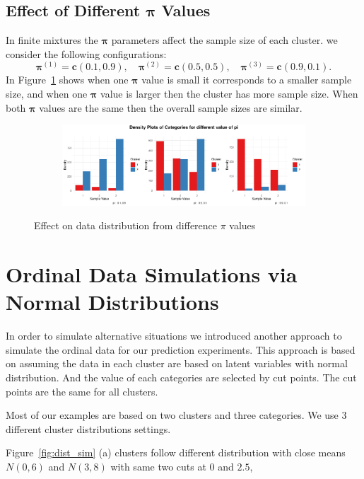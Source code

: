 \documentclass{article}
\begin{document}
\subsection{Effect of Different $\bm{\pi}$ Values}
In finite mixtures the $\bm{\pi}$ parameters affect the sample size of each cluster. 
we consider the following configurations:
\[
\bm{\pi}^{(1)} = \mathbf{c}(0.1, 0.9), \quad 
\bm{\pi}^{(2)} = \mathbf{c}(0.5, 0.5), \quad 
\bm{\pi}^{(3)} = \mathbf{c}(0.9, 0.1).
\]
In Figure~\ref{fig:pi} shows when one $\bm{\pi}$ value is small it corresponds to a smaller sample size, and when one $\bm{\pi}$ value is larger then the cluster has more sample size.
When both $\bm{\pi}$ values are the same then the overall sample sizes are similar.
\begin{figure}[htbp!]
  \centering
  \begin{subfigure}{1.0\textwidth}
      \centering
      \includegraphics[width=\textwidth]{images/para_sim/pi.png}
  \end{subfigure}
  \caption{Effect on data distribution from difference $\pi$ values}
  \label{fig:pi}
\end{figure}

\section{Ordinal Data Simulations via Normal Distributions}

In order to simulate alternative situations
 we introduced another approach to simulate the ordinal data 
for our prediction experiments. 
This approach is based on assuming the data in each cluster are based on latent variables with normal distribution.
And the value of each categories are selected by cut points. The cut points are the same for all clusters.

Most of our examples are based on two clusters and three categories. We use 3 different cluster distributions settings.

Figure~\ref*{fig:dist_sim} (a) clusters follow different distribution with close means $N(0,6)$ and $N(3,8)$
with same two cuts at $0$ and $2.5$,
\end{document}
